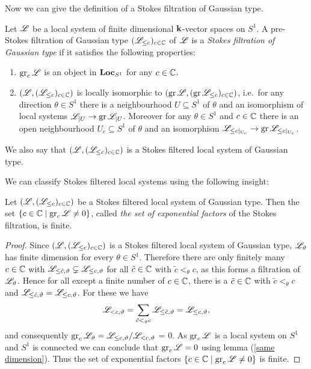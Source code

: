 Now we can give the definition of a Stokes filtration of Gaussian type.

\begin{defi}\label{Stokesfiltration} Let $\mathscr{L}$ be a local system of finite dimensional $\mathbf{k}$-vector spaces on $S^1$.
    A pre-Stokes filtration of Gaussian type $(\mathscr{L}_{\leq c})_{c\in\mathbb{C}}$ of $\mathscr{L}$ is a \emph{Stokes filtration of Gaussian type} if it satisfies the following properties:
    \begin{enumerate}
        \item $\operatorname{gr}_c \mathscr{L}$ is an object in $\mathbf{Loc}_{S^1}$ for any $c \in \mathbb{C}$.
        \item $(\mathscr{L}, (\mathscr{L}_{\leq c})_{c \in \mathbb{C}})$ is locally isomorphic to $(\operatorname{gr}\mathscr{L}, (\operatorname{gr}\mathscr{L}_{\leq c})_{c \in \mathbb{C}})$, i.e.\ for any direction $\theta \in S^1$ there is a neighbourhood $U \subseteq S^1$ of $\theta$ and an isomorphism of local systems $\mathscr{L}_{\vert U} \to \operatorname{gr}\mathscr{L}_{\vert U}$. Moreover for any $\theta \in S^1$ and $c \in \mathbb{C}$ there is an open neighbourhood $U_c \subseteq S^1$ of $\theta$ and an isomorphism $\mathscr{L}_{\leq c \vert_{U_c}} \to \operatorname{gr}\mathscr{L}_{\leq c\vert_{U_c}}$.
    \end{enumerate}
    We also say that $(\mathscr{L}, (\mathscr{L}_{\leq c})_{c \in \mathbb{C}})$ is a Stokes filtered local system of Gaussian type.
\end{defi}

We can classify Stokes filtered local systems using the following insight:

\begin{lem}
    Let $(\mathscr{L}, (\mathscr{L}_{\leq c})_{c \in \mathbb{C}})$ be a Stokes filtered local system of Gaussian type. Then the set $\left\{c \in \mathbb{C} \mid \operatorname{gr}_c\mathscr{L} \neq 0\right\}$, called \emph{the set of exponential factors} of the Stokes filtration, is finite.
\end{lem}
\begin{proof}
    Since $(\mathscr{L}, (\mathscr{L}_{\leq c})_{c \in \mathbb{C}})$ is a Stokes filtered local system of Gaussian type,  $\mathscr{L}_\vartheta$ has finite dimension for every $\theta \in S^1$. Therefore there are only finitely many $c \in \mathbb{C}$ with $\mathscr{L}_{\leq \tilde{c}, \vartheta} \subsetneq \mathscr{L}_{\leq c, \vartheta}$ for all $\tilde{c} \in \mathbb{C}$ with $\tilde{c} <_{\theta} c$, as this forms a filtration of $\mathscr{L}_\vartheta$. Hence for all except a finite number of $c \in \mathbb{C}$, there is a $\tilde{c} \in \mathbb{C}$ with $\tilde{c}<_{\theta} c$ and $\mathscr{L}_{\leq \tilde{c}, \vartheta} = \mathscr{L}_{\leq c, \vartheta}$. For these we have
\[
\mathscr{L}_{<c, \vartheta} = \sum_{\tilde{c} <_{\vartheta} c}\mathscr{L}_{\leq \tilde{c}, \vartheta} = \mathscr{L}_{\leq c, \vartheta},
\] and consequently $\operatorname{gr}_c\mathscr{L}_\vartheta = \mathscr{L}_{\leq c,\vartheta}/\mathscr{L}_{<c,\vartheta}$ = 0. As $\operatorname{gr}_c\mathscr{L}$ is a local system on $S^1$ and $S^1$ is connected we can conclude that $\operatorname{gr}_c\mathscr{L} = 0$ using lemma (\ref{same dimension}). Thus the set of exponential factors $\{c \in \mathbb{C} \mid \operatorname{gr}_c\mathscr{L}\neq 0\}$ is finite.  
\end{proof}
 

